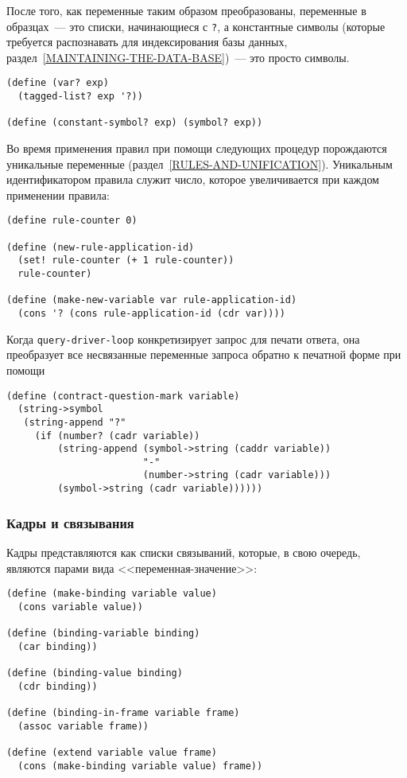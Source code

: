 После того, как переменные таким образом преобразованы,
переменные в образцах~--- это списки, начинающиеся с {\tt ?}, а
константные символы (которые требуется распознавать для индексирования
базы данных, раздел~\ref{MAINTAINING-THE-DATA-BASE})~---
это просто символы.

\begin{Verbatim}[fontsize=\small]
(define (var? exp)
  (tagged-list? exp '?))

(define (constant-symbol? exp) (symbol? exp))
\end{Verbatim}

Во время применения правил при помощи следующих процедур
порождаются уникальные переменные 
(раздел~\ref{RULES-AND-UNIFICATION}). Уникальным
идентификатором правила служит число, которое увеличивается при каждом
применении правила:

\begin{Verbatim}[fontsize=\small]
(define rule-counter 0)

(define (new-rule-application-id)
  (set! rule-counter (+ 1 rule-counter))
  rule-counter)

(define (make-new-variable var rule-application-id)
  (cons '? (cons rule-application-id (cdr var))))
\end{Verbatim}

Когда {\tt query-driver-loop} конкретизирует
запрос для печати ответа, она преобразует все несвязанные переменные
запроса обратно к печатной форме при помощи

\begin{Verbatim}[fontsize=\small]
(define (contract-question-mark variable)
  (string->symbol
   (string-append "?" 
     (if (number? (cadr variable))
         (string-append (symbol->string (caddr variable))
                        "-"
                        (number->string (cadr variable)))
         (symbol->string (cadr variable))))))
\end{Verbatim}

\subsubsection{Кадры и связывания}
\label{FRAMES-AND-BINDINGS}%


Кадры представляются как списки связываний, которые, в 
свою очередь, являются парами вида <<переменная-значение>>:

\begin{Verbatim}[fontsize=\small]
(define (make-binding variable value)
  (cons variable value))

(define (binding-variable binding)
  (car binding))

(define (binding-value binding)
  (cdr binding))

(define (binding-in-frame variable frame)
  (assoc variable frame))

(define (extend variable value frame)
  (cons (make-binding variable value) frame))
\end{Verbatim}

